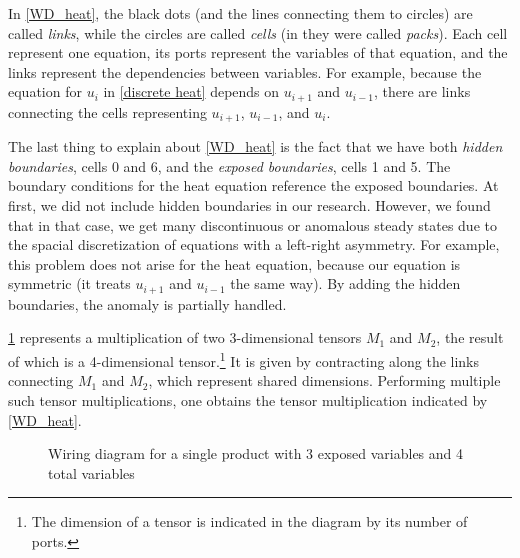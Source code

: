 \documentclass[11pt]{article}
\begin{document}
In \cref{WD_heat}, the black dots (and the lines connecting them to circles) are called \textit{links}, while the circles are called \textit{cells} (in \citep{Introduction_to_PA} they were called \textit{packs}). Each cell represent one equation, its ports represent the variables of that equation, and the links represent the dependencies between variables. For example, because the equation for $u_i$ in \cref{discrete heat} depends on $u_{i+1}$ and $u_{i-1}$, there are links connecting the cells representing $u_{i+1}$, $u_{i-1}$, and $u_i$.

The last thing to explain about \cref{WD_heat} is the fact that we have both \emph{hidden boundaries}, cells 0 and 6, and the \emph{exposed boundaries}, cells 1 and 5. The boundary conditions for the heat equation reference the exposed boundaries. At first, we did not include hidden boundaries in our research. However, we found that in that case, we get many discontinuous or anomalous steady states due to the spacial discretization of equations with a left-right asymmetry. For example, this problem does not arise for the heat equation, because our equation is symmetric (it treats $u_{i+1}$ and $u_{i-1}$ the same way). By adding the hidden boundaries, the anomaly is partially handled.

\cref{WD_oneproduct} represents a multiplication of two 3-dimensional tensors $M_1$ and $M_2$, the result of which is a 4-dimensional tensor.\footnote{The dimension of a tensor is indicated in the diagram by its number of ports.} It is given by contracting along the links connecting $M_1$ and $M_2$, which represent shared dimensions. Performing multiple such tensor multiplications, one obtains the tensor multiplication indicated by \cref{WD_heat}.


\begin{figure}
\caption{Wiring diagram for a single product with 3 exposed variables and 4 total variables}
\label{WD_oneproduct}
\begin{center}
\end{center}
\end{figure}
\end{document}
